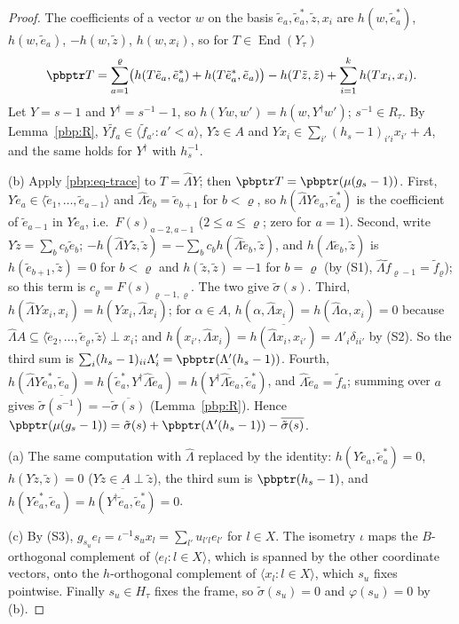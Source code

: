 \documentclass[10pt]{amsart}
\theoremstyle{definition}
\theoremstyle{remark}
\providecommand{\aubar}[1]{\overline{#1}}
\begin{document}
\begin{proof}
The coefficients of a vector $w$ on the basis $\tilde e_a,\tilde e_a^*,\tilde z,x_i$ are $h(w,\tilde
e_a^*)$, $h(w,\tilde e_a)$, $-h(w,\tilde z)$, $h(w,x_i)$, so for $T\in\operatorname{End}(Y_\tau)$
\begin{equation}\label{pbp:eq-trace}
\pbptr T=\sum_{a=1}^\varrho\bigl(h(T\tilde e_a,\tilde e_a^*)+h(T\tilde e_a^*,\tilde e_a)\bigr)
-h(T\tilde z,\tilde z)+\sum_{i=1}^kh(Tx_i,x_i).
\end{equation}
Let $Y=s-1$ and $Y^\dagger=s^{-1}-1$, so $h(Yw,w')=h(w,Y^\dagger w')$; $s^{-1}\in R_\tau$. By
Lemma~\ref{pbp:R}, $Y\tilde f_a\in\langle\tilde f_{a'}:a'<a\rangle$, $Y\tilde z\in A$ and $Yx_i\in
\sum_{i'}(h_s-1)_{i'i}x_{i'}+A$, and the same holds for $Y^\dagger$ with $h_s^{-1}$.

(b) Apply \eqref{pbp:eq-trace} to $T=\widehat\Lambda Y$; then $\pbptr T=\pbptr(\mu(g_s-1))$. First,
$Y\tilde e_a\in\langle\tilde e_1,\dots,\tilde e_{a-1}\rangle$ and $\widehat\Lambda\tilde e_b=\tilde e_{b+1}$
for $b<\varrho$, so $h(\widehat\Lambda Y\tilde e_a,\tilde e_a^*)$ is the coefficient of $\tilde e_{a-1}$ in
$Y\tilde e_a$, i.e.\ $F(s)_{a-2,a-1}$ ($2\le a\le\varrho$; zero for $a=1$). Second, write $Y\tilde z=
\sum_bc_b\tilde e_b$; $-h(\widehat\Lambda Y\tilde z,\tilde z)=-\sum_bc_bh(\widehat\Lambda\tilde e_b,
\tilde z)$, and $h(\widehat\Lambda\tilde e_b,\tilde z)$ is $h(\tilde e_{b+1},\tilde z)=0$ for $b<\varrho$
and $h(\tilde z,\tilde z)=-1$ for $b=\varrho$ (by (S1), $\widehat\Lambda\tilde f_{\varrho-1}=\tilde f_\varrho$);
so this term is $c_\varrho=F(s)_{\varrho-1,\varrho}$. The two give $\tilde\sigma(s)$. Third, $h(\widehat
\Lambda Yx_i,x_i)=h(Yx_i,\widehat\Lambda x_i)$; for $\alpha\in A$, $h(\alpha,\widehat\Lambda x_i)=
h(\widehat\Lambda\alpha,x_i)=0$ because $\widehat\Lambda A\subseteq\langle\tilde e_2,\dots,\tilde e_\varrho,
\tilde z\rangle\perp x_i$; and $h(x_{i'},\widehat\Lambda x_i)=\aubar{h(\widehat\Lambda x_i,x_{i'})}=
\Lambda'_i\delta_{ii'}$ by (S2). So the third sum is $\sum_i(h_s-1)_{ii}\Lambda'_i=\pbptr(\Lambda'
(h_s-1))$. Fourth, $h(\widehat\Lambda Y\tilde e_a^*,\tilde e_a)=h(\tilde e_a^*,Y^\dagger\widehat\Lambda
\tilde e_a)=\aubar{h(Y^\dagger\widehat\Lambda\tilde e_a,\tilde e_a^*)}$, and $\widehat\Lambda\tilde e_a=
\tilde f_a$; summing over $a$ gives $\aubar{\tilde\sigma(s^{-1})}=-\aubar{\tilde\sigma(s)}$
(Lemma~\ref{pbp:R}). Hence $\pbptr(\mu(g_s-1))=\tilde\sigma(s)+\pbptr(\Lambda'(h_s-1))-
\aubar{\tilde\sigma(s)}$.

(a) The same computation with $\widehat\Lambda$ replaced by the identity: $h(Y\tilde e_a,\tilde e_a^*)=0$,
$h(Y\tilde z,\tilde z)=0$ ($Y\tilde z\in A\perp\tilde z$), the third sum is $\pbptr(h_s-1)$, and
$h(Y\tilde e_a^*,\tilde e_a)=\aubar{h(Y^\dagger\tilde e_a,\tilde e_a^*)}=0$.

(c) By (S3), $g_{s_u}e_l=\iota^{-1}s_ux_l=\sum_{l'}u_{l'l}e_{l'}$ for $l\in X$. The isometry $\iota$ maps
the $B$-orthogonal complement of $\langle e_l:l\in X\rangle$, which is spanned by the other coordinate
vectors, onto the $h$-orthogonal complement of $\langle x_l:l\in X\rangle$, which $s_u$ fixes
pointwise. Finally $s_u\in H_\tau$ fixes the frame, so $\tilde\sigma(s_u)=0$ and $\varphi(s_u)=0$ by (b).
\end{proof}
\end{document}
